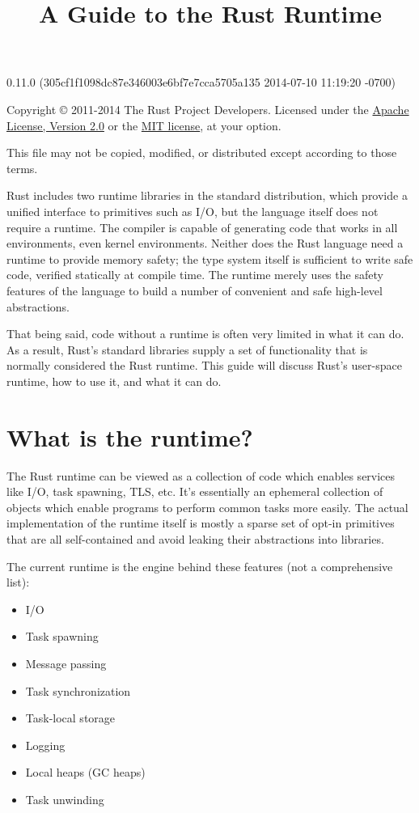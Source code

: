 \documentclass[]{article}
\title{A Guide to the Rust Runtime}
\begin{document}
\maketitle

0.11.0 (305cf1f1098dc87e346003e6bf7e7cca5705a135 2014-07-10 11:19:20 -0700)

Copyright © 2011-2014 The Rust Project Developers. Licensed under the
\href{http://www.apache.org/licenses/LICENSE-2.0}{Apache License,
Version 2.0} or the \href{http://opensource.org/licenses/MIT}{MIT
license}, at your option.

This file may not be copied, modified, or distributed except according
to those terms.

{
\hypersetup{linkcolor=black}
\setcounter{tocdepth}{3}
\tableofcontents
}
Rust includes two runtime libraries in the standard distribution, which
provide a unified interface to primitives such as I/O, but the language
itself does not require a runtime. The compiler is capable of generating
code that works in all environments, even kernel environments. Neither
does the Rust language need a runtime to provide memory safety; the type
system itself is sufficient to write safe code, verified statically at
compile time. The runtime merely uses the safety features of the
language to build a number of convenient and safe high-level
abstractions.

That being said, code without a runtime is often very limited in what it
can do. As a result, Rust's standard libraries supply a set of
functionality that is normally considered the Rust runtime. This guide
will discuss Rust's user-space runtime, how to use it, and what it can
do.

\section{What is the runtime?}\label{what-is-the-runtime}

The Rust runtime can be viewed as a collection of code which enables
services like I/O, task spawning, TLS, etc. It's essentially an
ephemeral collection of objects which enable programs to perform common
tasks more easily. The actual implementation of the runtime itself is
mostly a sparse set of opt-in primitives that are all self-contained and
avoid leaking their abstractions into libraries.

The current runtime is the engine behind these features (not a
comprehensive list):

\begin{itemize}
\itemsep1pt\parskip0pt
\item
  I/O
\item
  Task spawning
\item
  Message passing
\item
  Task synchronization
\item
  Task-local storage
\item
  Logging
\item
  Local heaps (GC heaps)
\item
  Task unwinding
\end{itemize}
\end{document}
